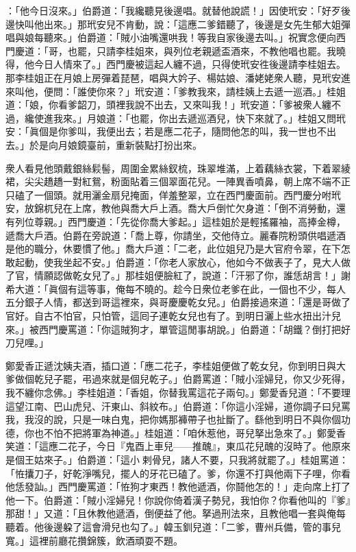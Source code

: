 ：「他今日沒來。」伯爵道：「我纔聽見後邊唱。就替他說謊！」因使玳安：「好歹後邊快叫他出來。」那玳安兒不肯動，說：「這應二爹錯聽了，後邊是女先生郁大姐彈唱與娘每聽來。」伯爵道：「賊小油嘴還哄我！等我自家後邊去叫。」祝實念便向西門慶道：「哥，也罷，只請李桂姐來，與列位老親遞盃酒來，不教他唱也罷。我曉得，他今日人情來了。」西門慶被這起人纏不過，只得使玳安徃後邊請李桂姐去。那李桂姐正在月娘上房彈着琵琶，唱與大妗子、楊姑娘、潘姥姥衆人聽，見玳安進來叫他，便問：「誰使你來？」玳安道：「爹教我來，請桂姨上去遞一巡酒。」桂姐道：「娘，你看爹韶刀，頭裡我說不出去，又來叫我！」玳安道：「爹被衆人纏不過，纔使進我來。」月娘道：「也罷，你出去遞巡酒兒，快下來就了。」桂姐又問玳安：「眞個是你爹叫，我便出去；若是應二花子，隨問他怎的叫，我一世也不出去。」於是向月娘鏡臺前，重新裝點打扮出來。

衆人看見他頭戴銀絲鬏髻，周圍金累絲釵梳，珠翠堆滿，上着藕絲衣裳，下着翠綾裙，尖尖趫趫一對紅鴛，粉面貼着三個翠面花兒。一陣異香噴鼻，朝上席不端不正只磕了一個頭。就用灑金扇兒掩面，佯羞整翠，立在西門慶面前。西門慶分咐玳安，放錦杌兒在上席，教他與喬大戶上酒。喬大戶倒忙欠身道：「倒不消勞動，還有列位尊親。」西門慶道：「先從你喬大爹起。」這桂姐於是輕搖羅袖，高捧金樽，遞喬大戶酒。伯爵在旁說道：「喬上尊，你請坐，交他侍立。麗春院粉頭供唱遞酒是他的職分，休要慣了他。」喬大戶道：「二老，此位姐兒乃是大官府令翠，在下怎敢起動，使我坐起不安。」伯爵道：「你老人家放心，他如今不做表子了，見大人做了官，情願認做乾女兒了。」那桂姐便臉紅了，說道：「汗邪了你，誰恁胡言！」謝希大道：「眞個有這等事，俺每不曉的。趁今日衆位老爹在此，一個也不少，每人五分銀子人情，都送到哥這裡來，與哥慶慶乾女兒。」{}伯爵接過來道：「還是哥做了官好。自古不怕官，只怕管，這囘子連乾女兒也有了。到明日灑上些水扭出汁兒來。」被西門慶罵道：「你這賊狗才，單管這閒事胡說。」伯爵道：「胡鐵？倒打把好刀兒哩。」

鄭愛香正遞沈姨夫酒，插口道：「應二花子，李桂姐便做了乾女兒，你到明日與大爹做個乾兒子罷，弔過來就是個兒乾子。」伯爵罵道：「賊小淫婦兒，你又少死得，我不纏你念佛。」李桂姐道：「香姐，你替我罵這花子兩句。」鄭愛香兒道：「不要理這望江南、巴山虎兒、汗東山、斜紋布。」{}伯爵道：「你這小淫婦，道你調子曰兒罵我，我沒的說，只是一味白鬼，把你媽那褲帶子也扯斷了。繇他到明日不與你個功德，你也不怕不把將軍為神道。」桂姐道：「咱休惹他，哥兒拏出急來了。」鄭愛香笑道：「這應二花子，今日『鬼酉上車兒——推醜』，東瓜花兒醜的沒時了。他原來是個王姑來子。」伯爵道：「這小𢱉剌骨兒，諸人不要，只我將就罷了。」桂姐罵道：「恠攮刀子，好乾淨嘴兒，擺人的牙花已磕了。爹，你還不打與他兩下子哩，你看他恁發訕。」西門慶罵道：「恠狗才東西！教他遞酒，你鬪他怎的！」走向席上打了他一下。伯爵道：「賊小淫婦兒！你說你倚着漢子勢兒，我怕你？你看他叫的『爹』那甜！」又道：「且休教他遞酒，倒便益了他。拏過刑法來，且教他唱一套與俺每聽着。他後邊躱了這會滑兒也勾了。」韓玉釧兒道：「二爹，曹州兵備，管的事兒寬。」這裡前廳花攢錦簇，飲酒頑耍不題。

